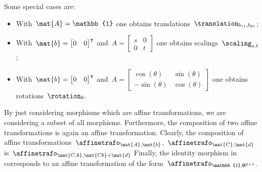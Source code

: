 \begin{solution}
\begin{itemize}
              Some special cases are:
              \begin{itemize}
                  \item With~$\mat{A}=\mathbb{1}$ one obtains translations~$\translation_{b_{11},b_{21}}$;
                  \item With~$\mat{b}=\begin{bmatrix}0&0\end{bmatrix}^\intercal$ and~$A=\begin{bmatrix} s&0\\0&t\end{bmatrix}$ one obtains scalings~$\scaling_{s,t}$;
                  \item With~$\mat{b}=\begin{bmatrix}0&0\end{bmatrix}^\intercal$ and~$A=\begin{bmatrix} \cos(\theta)&\sin(\theta)\\-\sin(\theta)&\cos(\theta)\end{bmatrix}$ one obtains rotations~$\rotation_{\theta}$.
              \end{itemize}
              By just considering morphisms which are affine transformations, we are considering a subset of all morphisms.
              Furthermore, the composition of two affine transformations is again an affine transformation.
              Clearly, the composition of affine transformations~$\affinetrafo_{\mat{A},\mat{b}}$,~$\affinetrafo_{\mat{C},\mat{d}}$ is~$\affinetrafo_{\mat{CA},\mat{Cb}+\mat{d}}$
              Finally, the identity morphism in \Draw corresponds to an affine transformation of the form~$\affinetrafo_{\mathbb{1},\mathbf{0}^{2\times 1}}$.
    \end{itemize}
\end{solution}

